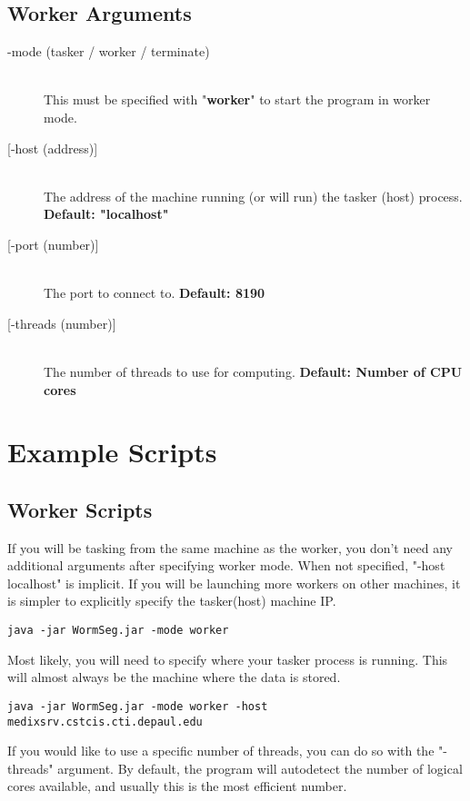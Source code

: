 \documentclass[]{article}
\begin{document}
\subsection{Worker Arguments}
\begin{description}
	\item[-mode (tasker / worker / terminate)] \hfill \\
	This must be specified with "\textbf{worker}" to start the program in worker mode.
	\item[{[-host (address)]}] \hfill \\
	The address of the machine running (or will run) the tasker (host) process. \textbf{Default: "localhost"}
	\item[{[-port (number)]}] \hfill \\
	The port to connect to. \textbf{Default: 8190}
	\item[{[-threads (number)]}] \hfill \\
	The number of threads to use for computing. \textbf{Default: Number of CPU cores}
\end{description}

\section{Example Scripts}
\subsection{Worker Scripts}
If you will be tasking from the same machine as the worker, you don't need any additional arguments after specifying worker mode. When not specified, "-host localhost" is implicit. If you will be launching more workers on other machines, it is simpler to explicitly specify the tasker(host) machine IP.
\begin{lstlisting}[language=command.com, breaklines=true, caption=Local Machine Worker]
java -jar WormSeg.jar -mode worker
\end{lstlisting}

Most likely, you will need to specify where your tasker process is running. This will almost always be the machine where the data is stored.

\begin{lstlisting}[language=command.com, breaklines=true, caption=Host specified]
java -jar WormSeg.jar -mode worker -host medixsrv.cstcis.cti.depaul.edu
\end{lstlisting}

If you would like to use a specific number of threads, you can do so with the "-threads" argument. By default, the program will autodetect the number of logical cores available, and usually this is the most efficient number.
\end{document}
